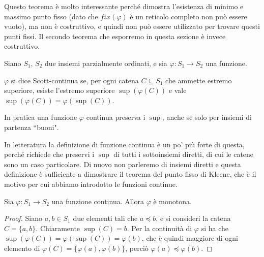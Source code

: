 \documentclass[12pt]{article}
\numberwithin{theorem}{subsection}
\begin{document}
Questo teorema è molto interessante perché dimostra l'esistenza di minimo e massimo punto fisso (dato che $fix(\varphi)$ è un reticolo completo non può essere vuoto), ma non è costruttivo, e quindi non può essere utilizzato per trovare questi punti fissi. Il secondo teorema che esporremo in questa sezione è invece costruttivo.

\begin{definition}
	Siano $S_1$, $S_2$ due insiemi parzialmente ordinati, e sia $\varphi : S_1 \rightarrow S_2$ una funzione.
	
	$\varphi$ si dice Scott-continua se, per ogni catena $C \subseteq S_1$ che ammette estremo superiore, esiste l'estremo superiore $\sup(\varphi(C))$ e vale $\sup(\varphi(C)) = \varphi(\sup(C))$.
\end{definition}

In pratica una funzione $\varphi$ continua preserva i $\sup$, anche se solo per insiemi di partenza ``buoni".

In letteratura la definizione di funzione continua è un po' più forte di questa, perché richiede che preservi i $\sup$ di tutti i sottoinsiemi diretti, di cui le catene sono un caso particolare. Di nuovo non parleremo di insiemi diretti e questa definizione è sufficiente a dimostrare il teorema del punto fisso di Kleene, che è il motivo per cui abbiamo introdotto le funzioni continue.

\begin{lemma}
	Sia $\varphi : S_1 \rightarrow S_2$ una funzione continua. Allora $\varphi$ è monotona.
\end{lemma}
\begin{proof}
	Siano $a, b \in S_1$ due elementi tali che $a \preceq b$, e si consideri la catena $C = \{ a, b \}$. Chiaramente $\sup(C) = b$. Per la continuità di $\varphi$ si ha che $\sup(\varphi(C)) = \varphi(\sup(C)) = \varphi(b)$, che è quindi maggiore di ogni elemento di $\varphi(C) = \{ \varphi(a), \varphi(b) \}$, perciò $\varphi(a) \preceq \varphi(b)$.
\end{proof}
\end{document}

